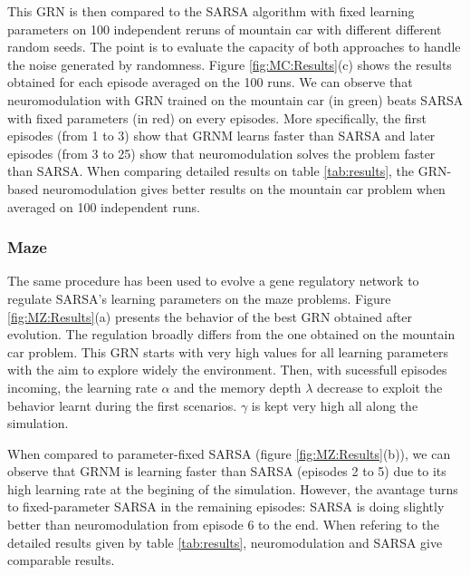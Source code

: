 This GRN is then compared to the SARSA algorithm with fixed learning parameters on 100 independent reruns of mountain car with different different random seeds. The point is to evaluate the capacity of both approaches to handle the noise generated by randomness. Figure \ref{fig:MC:Results}(c) shows the results obtained for each episode averaged on the 100 runs. We can observe that neuromodulation with GRN trained on the mountain car (in green) beats SARSA with fixed parameters (in red) on every episodes. More specifically, the first episodes (from 1 to 3) show that GRNM learns faster than SARSA and later episodes (from 3 to 25) show that neuromodulation solves the problem faster than SARSA. When comparing detailed results on table \ref{tab:results}, the GRN-based neuromodulation gives better results on the mountain car problem when averaged on 100 independent runs. 

\subsubsection{Maze}
The same procedure has been used to evolve a gene regulatory network to regulate SARSA's learning parameters on the maze problems. Figure \ref{fig:MZ:Results}(a) presents the behavior of the best GRN obtained after evolution. The regulation broadly differs from the one obtained on the mountain car problem. This GRN starts with very high values for all learning parameters with the aim to explore widely the environment. Then, with sucessfull episodes incoming, the learning rate $\alpha$ and the memory depth $\lambda$ decrease to exploit the behavior learnt during the first scenarios. $\gamma$ is kept very high all along the simulation.

When compared to parameter-fixed SARSA (figure \ref{fig:MZ:Results}(b)), we can observe that GRNM is learning faster than SARSA (episodes 2 to 5) due to its high learning rate at the begining of the simulation. However, the avantage turns to fixed-parameter SARSA in the remaining episodes: SARSA is doing slightly better than neuromodulation from episode 6 to the end. When refering to the detailed results given by table \ref{tab:results}, neuromodulation and SARSA give comparable results. 


